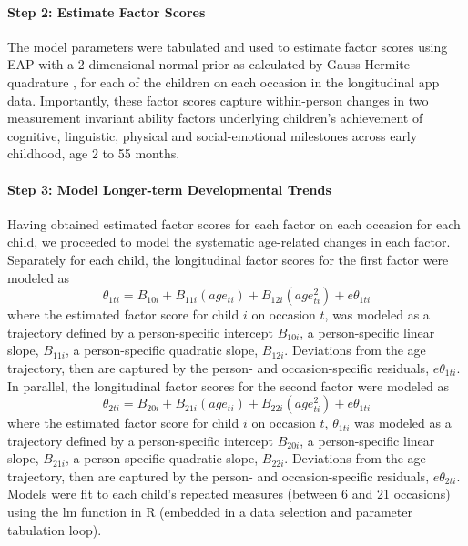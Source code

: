 \documentclass[man, floatsintext]{apa7}
\begin{document}
\paragraph{Step 2: Estimate Factor
Scores}
The model parameters were tabulated and used to estimate factor scores
using EAP with a 2-dimensional normal prior as calculated by
Gauss-Hermite quadrature \parencite{embretson2013}, for each of the children on each occasion
in the longitudinal app data. Importantly, these factor scores capture
within-person changes in two measurement invariant ability factors
underlying children's achievement of cognitive, linguistic, physical and
social-emotional milestones across early childhood, age 2 to 55 months.

\paragraph{Step 3: Model Longer-term Developmental Trends}

Having obtained estimated factor scores for each factor on each occasion
for each child, we proceeded to model the systematic age-related changes
in each factor. Separately for each child, the longitudinal factor
scores for the first factor were modeled as 
\begin{equation}
\theta_{1ti} = B_{10i} + B_{11i}(age_{ti}) + B_{12i}(age^2_{ti}) + e\theta_{1ti}
\end{equation} 
where the estimated factor score for child $i$ on
occasion $t$, was modeled as a trajectory defined by a person-specific
intercept $B_{10i}$, a person-specific linear slope, $B_{11i}$, a
person-specific quadratic slope, $B_{12i}$. Deviations from the age
trajectory, then are captured by the person- and occasion-specific
residuals, $e\theta_{1ti}$. In parallel, the longitudinal factor
scores for the second factor were modeled as 
\begin{equation}
\theta_{2ti} = B_{20i} + B_{21i}(age_{ti}) + B_{22i}(age^2_{ti}) + e\theta_{1ti}
\end{equation} where the estimated factor score for child $i$ on
occasion $t$, $\theta_{1ti}$ was modeled as a trajectory defined by
a person-specific intercept $B_{20i}$, a person-specific linear slope,
$B_{21i}$, a person-specific quadratic slope, $B_{22i}$. Deviations
from the age trajectory, then are captured by the person- and
occasion-specific residuals, $e\theta_{2ti}$. Models were fit to each
child's repeated measures (between 6 and 21 occasions) using the lm
function in R (embedded in a data selection and parameter tabulation
loop).
\end{document}
